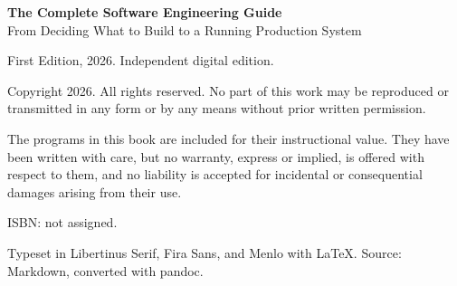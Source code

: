 \thispagestyle{empty}
\begingroup
\footnotesize\setlength{\parindent}{0pt}\setlength{\parskip}{6pt}
\vspace*{\fill}

\textbf{The Complete Software Engineering Guide}\\
From Deciding What to Build to a Running Production System

First Edition, 2026. Independent digital edition.

Copyright \textcopyright{} 2026. All rights reserved. No part of this work may be reproduced or
transmitted in any form or by any means without prior written permission.

The programs in this book are included for their instructional value. They have been written
with care, but no warranty, express or implied, is offered with respect to them, and no
liability is accepted for incidental or consequential damages arising from their use.

ISBN: not assigned.

\vspace{10pt}
{\color{muted}Typeset in Libertinus Serif, Fira Sans, and Menlo with \LaTeX.
Source: Markdown, converted with pandoc.}
\endgroup
\clearpage
